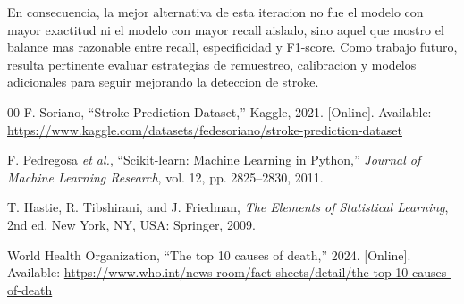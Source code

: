 \documentclass[conference]{IEEEtran}
\begin{document}
En consecuencia, la mejor alternativa de esta iteracion no fue el modelo con mayor exactitud ni el modelo con mayor recall aislado, sino aquel que mostro el balance mas razonable entre recall, especificidad y F1-score. Como trabajo futuro, resulta pertinente evaluar estrategias de remuestreo, calibracion y modelos adicionales para seguir mejorando la deteccion de stroke.

\begin{thebibliography}{00}
F. Soriano, ``Stroke Prediction Dataset,'' Kaggle, 2021. [Online]. Available: \url{https://www.kaggle.com/datasets/fedesoriano/stroke-prediction-dataset}

F. Pedregosa \textit{et al.}, ``Scikit-learn: Machine Learning in Python,'' \textit{Journal of Machine Learning Research}, vol. 12, pp. 2825--2830, 2011.

T. Hastie, R. Tibshirani, and J. Friedman, \textit{The Elements of Statistical Learning}, 2nd ed. New York, NY, USA: Springer, 2009.

World Health Organization, ``The top 10 causes of death,'' 2024. [Online]. Available: \url{https://www.who.int/news-room/fact-sheets/detail/the-top-10-causes-of-death}
\end{thebibliography}
\end{document}
